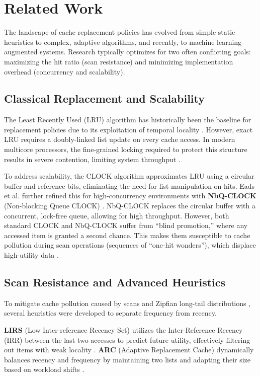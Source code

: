 \section{Related Work}

The landscape of cache replacement policies has evolved from simple
static heuristics to complex, adaptive algorithms, and recently, to
machine learning-augmented systems. Research typically optimizes for
two often conflicting goals: maximizing the hit ratio (scan
resistance) and minimizing implementation overhead (concurrency and
scalability).

\subsection{Classical Replacement and Scalability}
The Least Recently Used (LRU) algorithm has historically been the
baseline for replacement policies due to its exploitation of temporal
locality \cite{Denning2005Locality}. However, exact LRU requires a
doubly-linked list update on every cache access. In modern multicore
processors, the fine-grained locking required to protect this
structure results in severe contention, limiting system throughput
\cite{Herlihy2006The}.

To address scalability, the CLOCK algorithm approximates LRU using a
circular buffer and reference bits, eliminating the need for list
manipulation on hits. Eads et al. further refined this for
high-concurrency environments with \textbf{NbQ-CLOCK} (Non-blocking
Queue CLOCK) \cite{Eads2014NbQCLOCK}. NbQ-CLOCK replaces the circular
buffer with a concurrent, lock-free queue, allowing for high
throughput. However, both standard CLOCK and NbQ-CLOCK suffer from
``blind promotion,'' where any accessed item is granted a second
chance. This makes them susceptible to cache pollution during scan
operations (sequences of ``one-hit wonders''), which displace
high-utility data \cite{Jiang2005CLOCKPro}.

\subsection{Scan Resistance and Advanced Heuristics}
To mitigate cache pollution caused by scans and Zipfian long-tail
distributions \cite{Breslau1999Web}, several heuristics were
developed to separate frequency from recency.

\textbf{LIRS} (Low Inter-reference Recency Set) utilizes the
Inter-Reference Recency (IRR) between the last two accesses to
predict future utility, effectively filtering out items with weak
locality \cite{Jiang2002LIRS}. \textbf{ARC} (Adaptive Replacement
Cache) dynamically balances recency and frequency by maintaining two
lists and adapting their size based on workload shifts \cite{Megiddo2003ARC}.

